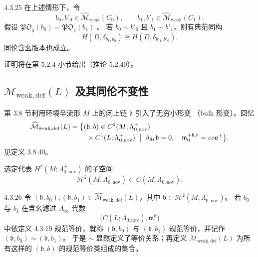 \begin{proposition}{4.3.25}\label{prop:4-3-25}
在上述情形下，令
\[
 b_0,b'_0\in\widehat{\mathcal M}_{\mathrm{weak}}(C_0),
 \qquad
 b_1,b'_1\in\widehat{\mathcal M}_{\mathrm{weak}}(C_1).
\]
假设
$\mathfrak{PO}_0(b_0)=\mathfrak{PO}_1(b_1)$
。
若 $b_0\sim b'_0$ 且 $b_1\sim b'_1$，则有典范同构
\[
 H(D,\delta_{b_1,b_0})
 \cong
 H(D,\delta_{b'_1,b'_0}).
\]
同伦含幺版本也成立。
\end{proposition}

证明将在第 5.2.4 小节给出（推论 5.2.40）。

\subsection{$\mathcal M_{\mathrm{weak,def}}(L)$ 及其同伦不变性}
\label{subsec:4-3-3}

第 3.8 节利用环境辛流形 $M$ 上的闭上链 $\mathfrak b$ 引入了无穷小形变
（bulk 形变）。回忆
\[
 \begin{aligned}
 \widehat{\mathcal M}_{\mathrm{weak,def}}(L)
 ={}&\bigl\{(\mathfrak b,b)\in
 C^2(M;\Lambda^+_{0,\mathrm{nov}})\\[-0.2em]
 &\quad{}\times C^1(L;\Lambda^+_{0,\mathrm{nov}})
 \ \bigm|\ 
 \delta_M\mathfrak b=0,\quad
 \mathfrak m_0^{+\mathfrak b,b}=ce\mathbf e^+
 \bigr\}.
 \end{aligned}
\]
见定义 3.8.40。

选定代表
$H^2(M;\Lambda^+_{0,\mathrm{nov}})$ 的子空间
\[
 \mathcal H^2(M;\Lambda^+_{0,\mathrm{nov}})
 \subset C(M;\Lambda^+_{0,\mathrm{nov}}).
\]

\begin{definition}{4.3.26}\label{def:4-3-26}
令
$(\mathfrak b,b_0),(\mathfrak b,b_1)
\in\widehat{\mathcal M}_{\mathrm{weak,def}}(L)$，其中
$\mathfrak b\in\mathcal H^2(M;\Lambda^+_{0,\mathrm{nov}})$。
若 $b_0$ 与 $b_1$ 在含幺滤过 $A_\infty$ 代数
\[
 \bigl(C(L;\Lambda_{0,\mathrm{nov}}),\mathfrak m^{\mathfrak b}\bigr)
\]
中依定义 4.3.19 规范等价，就称
$(\mathfrak b,b_0)$ 与 $(\mathfrak b,b_1)$ 规范等价，并记作
$(\mathfrak b,b_0)\sim(\mathfrak b,b_1)$。
于是 $\sim$ 显然定义了等价关系；再定义
$\mathcal M_{\mathrm{weak,def}}(L)$ 为所有这样的
$(\mathfrak b,b)$ 的规范等价类组成的集合。
\end{definition}


